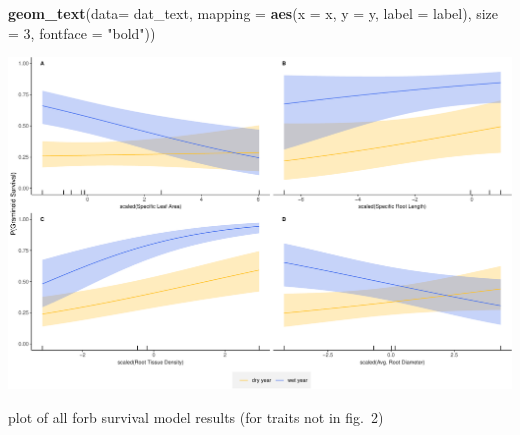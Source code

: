 \documentclass[
]{article}
\newenvironment{Shaded}{\begin{snugshade}}{\end{snugshade}}
\newcommand{\DataTypeTok}[1]{\textcolor[rgb]{0.13,0.29,0.53}{#1}}
\newcommand{\DecValTok}[1]{\textcolor[rgb]{0.00,0.00,0.81}{#1}}
\newcommand{\KeywordTok}[1]{\textcolor[rgb]{0.13,0.29,0.53}{\textbf{#1}}}
\newcommand{\NormalTok}[1]{#1}
\newcommand{\StringTok}[1]{\textcolor[rgb]{0.31,0.60,0.02}{#1}}
\begin{document}
\begin{Shaded}
\begin{Highlighting}[]
\StringTok{  }\KeywordTok{geom\_text}\NormalTok{(}\DataTypeTok{data=}\NormalTok{ dat\_text, }\DataTypeTok{mapping =} \KeywordTok{aes}\NormalTok{(}\DataTypeTok{x =}\NormalTok{ x, }\DataTypeTok{y =}\NormalTok{ y, }\DataTypeTok{label =}\NormalTok{ label), }\DataTypeTok{size =} \DecValTok{3}\NormalTok{, }\DataTypeTok{fontface =} \StringTok{"bold"}\NormalTok{))}
\end{Highlighting}
\end{Shaded}

\includegraphics{figures/supGramSurvPlots-1.pdf}

plot of all forb survival model results (for traits not in fig.~2)
\end{document}
